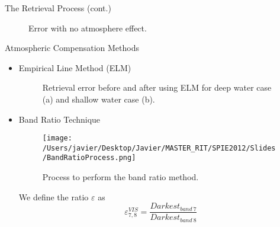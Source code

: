 \documentclass[mathserif]{beamer}
\begin{document}
\begin{frame}{}
\begin{columns}[t]
\begin{column}{.3\linewidth}
\begin{block}{The Retrieval Process (cont.)}
\begin{figure}[t]
\centering
            \caption[LUTs]  { \label{fig:errorNoAt} Error with no atmosphere effect.}
\end{figure}
\vspace{1cm}
\end{block} 
\begin{block}{Atmospheric Compensation Methods}
\vspace{1cm}
\begin{itemize}
\item Empirical Line Method (ELM){\small\cite{Schott}}\\
\begin{figure}[t]
\centering
            \caption[LUTs]  {\label{fig:ELMerror} Retrieval error before and after using ELM for deep water case (a) and shallow water case (b).}
\end{figure}
\vspace{1cm}
\item Band Ratio Technique\cite{Gordon94}\\
\begin{center}
\begin{figure}
	\texttt{[image: /Users/javier/Desktop/Javier/MASTER\_RIT/SPIE2012/Slides/BandRatioProcess.png]}
	\caption{\label{fig:BandRatioProcess} Process to perform the band ratio method. }
\end{figure}
\end{center}
\vspace{1cm}
\justifying\small We define the ratio $\varepsilon$ as
\begin{equation}
\label{eq:epsilon}
	\varepsilon_{7,8}^{VIS} =\frac{Darkest_{band~7}} {Darkest_{band~8}}
\end{equation}

\end{itemize}
\end{block}
\end{column}
\end{columns}
\end{frame}
\end{document}

